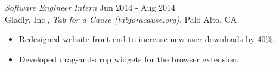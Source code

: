 {\sl Software Engineer Intern} \hfill Jun 2014 - Aug 2014 \\
Gladly, Inc., \textit{Tab for a Cause (tabforacause.org)}, Palo Alto, CA
\begin{itemize} \itemsep -2pt %
\item Redesigned website front-end to increase new user downloads by 40\%.
\item Developed drag-and-drop widgets for the browser extension.
\end{itemize}
